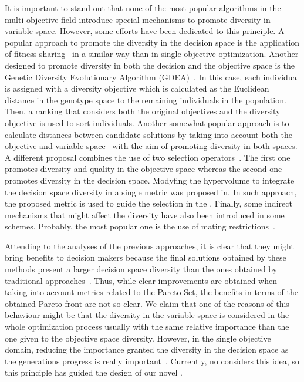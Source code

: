 It is important to stand out that none of the most popular algorithms in the multi-objective field introduce special mechanisms to promote diversity in variable space.
%
However, some efforts have been dedicated to this principle.
%
A popular approach to promote the diversity in the decision space is the application of fitness sharing~\cite{Joel:NPGA} in a similar way than in single-objective optimization.
%
Another \MOEA{} designed to promote diversity in both the decision and the objective space is the Genetic
Diversity Evolutionary Algorithm (GDEA)~\cite{toffolo2003genetic}.
%
In this case, each individual is assigned with a diversity objective which is calculated as the
Euclidean distance in the genotype space to the remaining individuals in the population.
%
Then, a ranking that considers both the original objectives and the diversity objective is used
to sort individuals.
%
Another somewhat popular approach is to calculate distances between candidate solutions by taking
into account both the objective and variable space~\cite{deb2005omni,shir2009enhancing} with the aim
of promoting diversity in both spaces.
%
A different proposal combines the use of two selection operators~\cite{chan2005evolutionary}.
%
The first one promotes diversity and quality in the objective space whereas the second one promotes diversity in the decision space.
%
Modyfing the hypervolume to integrate the decision space diversity in a single metric was proposed in\cite{ulrich2010integrating}.
%
In such approach, the proposed metric is used to guide the selection in the \MOEA{}.
%
Finally, some indirect mechanisms that might affect the diversity have also been introduced in some schemes.
%
Probably, the most popular one is the use of mating restrictions~\cite{Joel:STUDY_MATTING_RESTRICTION,Joel:MOEAD_AMS}.

Attending to the analyses of the previous approaches, it is clear that they might bring benefits to decision makers
because the final solutions obtained by these methods present a larger decision space diversity than the ones obtained
by traditional approaches~\cite{deb2005omni, rudolph2007capabilities}.
%
Thus, while clear improvements are obtained when taking into account metrics related to the Pareto Set, the benefits in terms of the 
obtained Pareto front are not so clear.
%
We claim that one of the reasons of this behaviour might be that the diversity in the variable space is considered in the whole optimization process
usually with the same relative importance than the one given to the objective space diversity.
%
However, in the single objective domain, reducing the importance granted the diversity in the decision space as the generations progress is really important~\cite{Joel:MULTI_DYNAMIC}.
%
Currently, no \MOEA{} considers this idea, so this principle has guided the design of our novel \MOEA{}.
